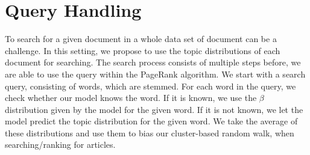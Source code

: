 \section{Query Handling}
To search for a given document in a whole data set of document can be a challenge. 
In this setting, we propose to use the topic distributions of each document for searching.
The search process consists of multiple steps before, we are able to use the query within the PageRank algorithm. 
We start with a search query, consisting of words, which are stemmed.
For each word in the query, we check whether our model knows the word.
If it is known, we use the $\beta$ distribution given by the model for the given word. 
If it is not known, we let the model predict the topic distribution for the given word.
We take the average of these distributions and use them to bias our cluster-based random walk, when searching/ranking for articles.
 